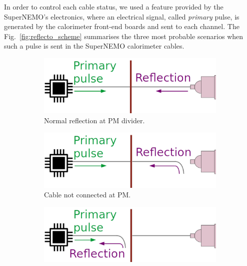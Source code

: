 In order to control each cable status, we used a feature provided by the SuperNEMO's electronics, where an electrical signal, called \emph{primary} pulse, is generated by the calorimeter front-end boards and sent to each channel.
The Fig.~\ref{fig:reflecto_scheme} summarises the three most probable scenarios when such a pulse is sent in the SuperNEMO calorimeter cables.
\begin{figure}[h!]
  \centering
  \begin{subfigure}[b]{0.3\textwidth}
    \centering
    \includegraphics[width=1.1\textwidth]{commissioning/fig_commissioning/scheme_reflecto.pdf}
    \captionsetup{justification=centering}
    \caption{Normal reflection at PM divider.
      \label{subfig:reflecto_normal}}
  \end{subfigure}
  \hfill
  \begin{subfigure}[b]{0.3\textwidth}
    \centering
    \includegraphics[width=1.1\textwidth]{commissioning/fig_commissioning/scheme_reflecto_1.pdf}
    \captionsetup{justification=centering}
    \caption{Cable not connected at PM.
      \label{subfig:reflecto_pmt}}
  \end{subfigure}
  \hfill
  \begin{subfigure}[b]{0.3\textwidth}
    \centering
    \includegraphics[width=1.1\textwidth]{commissioning/fig_commissioning/scheme_reflecto_2.pdf}

\end{subfigure}
\end{figure}
